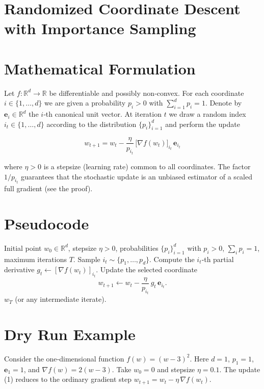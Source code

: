 \documentclass{article}
\newcommand{\R}{\mathbb{R}}
\newcommand{\e}{\mathbf{e}}
\begin{document}
\section*{Randomized Coordinate Descent with Importance Sampling}

\section*{Mathematical Formulation}
Let $f:\R^{d}\rightarrow\R$ be differentiable and possibly non‑convex.
For each coordinate $i\in\{1,\dots ,d\}$ we are given a probability
$p_i>0$ with $\sum_{i=1}^{d}p_i=1$.
Denote by $\e_i\in\R^{d}$ the $i$‑th canonical unit vector.
At iteration $t$ we draw a random index $i_t\in\{1,\dots ,d\}$ according to
the distribution $\{p_i\}_{i=1}^{d}$ and perform the update  

\[
\boxed{
w_{t+1}=w_{t}-\frac{\eta}{p_{i_t}}\,
\bigl[\nabla f(w_t)\bigr]_{i_t}\,\e_{i_t}}
\tag{1}
\]

where $\eta>0$ is a stepsize (learning rate) common to all coordinates.
The factor $1/p_{i_t}$ guarantees that the stochastic update is an
unbiased estimator of a scaled full gradient (see the proof).

\section*{Pseudocode}
\begin{algorithm}[H]
\caption{Randomized Coordinate Descent (RCD) with importance sampling}
\begin{algorithmic}[1]
\Require Initial point $w_0\in\R^{d}$, stepsize $\eta>0$, probabilities
$\{p_i\}_{i=1}^{d}$ with $p_i>0$, $\sum_i p_i=1$,
maximum iterations $T$.
    \State Sample $i_t\sim\{p_1,\dots ,p_d\}$.
    \State Compute the $i_t$‑th partial derivative 
          $g_{t}\gets [\nabla f(w_t)]_{i_t}$.
    \State Update the selected coordinate
          \[
          w_{t+1}\gets w_t-\frac{\eta}{p_{i_t}}\,g_{t}\,\e_{i_t}.
          \]
\EndFor
\State \Return $w_T$ (or any intermediate iterate).
\end{algorithmic}
\end{algorithm}

\section*{Dry Run Example}
Consider the one‑dimensional function $f(w)=(w-3)^2$.
Here $d=1$, $p_1=1$, $\e_1=1$, and $\nabla f(w)=2(w-3)$.
Take $w_0=0$ and stepsize $\eta=0.1$.
The update (1) reduces to the ordinary gradient step
$w_{t+1}=w_t-\eta\,\nabla f(w_t)$.
\end{document}
